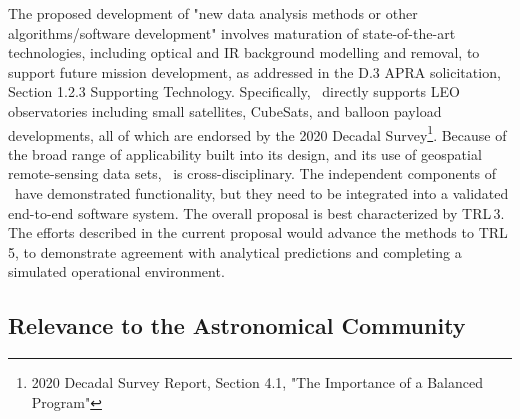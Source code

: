 \documentclass[usenames,dvipsnames,modern]{CLASS_FILES/aastex631}  %
\begin{document}
The proposed development of "new data analysis methods or other algorithms/software development" involves maturation of state-of-the-art technologies, including optical and IR background modelling and removal, to support future mission development, as addressed in the D.3 APRA solicitation, Section 1.2.3 Supporting Technology.
Specifically, \MyName\ directly supports LEO observatories including small satellites, CubeSats, and balloon payload developments, all of which are endorsed by the 2020 Decadal Survey\footnote{2020 Decadal Survey Report, Section 4.1, "The Importance of a Balanced Program"}. Because of the broad range of applicability built into its design, and its use of geospatial remote-sensing data sets, \MyName\ is cross-disciplinary. The independent components of \MyName\ have demonstrated functionality, but they need to be integrated into a validated end-to-end software system. The overall proposal is best characterized by TRL\,3. The efforts described in the current proposal would advance the methods to TRL\,5, to demonstrate agreement with analytical predictions and completing a simulated operational environment.

\subsection{Relevance to the Astronomical Community}

\end{document}
